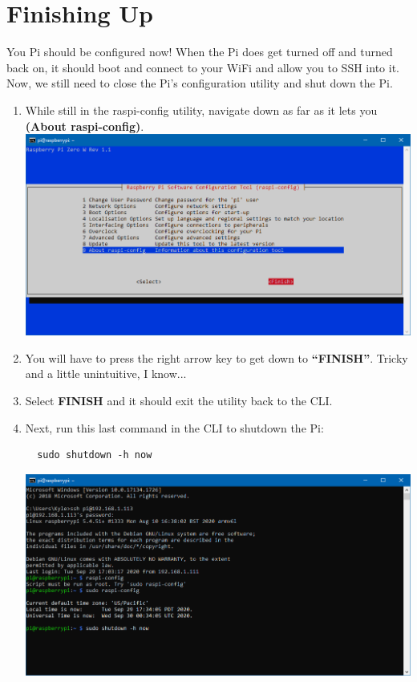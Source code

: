 \documentclass{article}
\begin{document}
\section{Finishing Up}

You Pi should be configured now! When the Pi does get turned off and turned back on, it should boot and connect to your WiFi and allow you to SSH into it. Now, we still need to close the Pi's configuration utility and shut down the Pi.

\begin{enumerate}
  \item While still in the raspi-config utility, navigate down as far as it lets you \textbf{(About raspi-config)}.
  \newline
  \newline
  \includegraphics[width=1.00\textwidth]{rcfinish}
  \item You will have to press the right arrow key to get down to \textbf{``FINISH''}. Tricky and a little unintuitive, I know...
  \item Select \textbf{FINISH} and it should exit the utility back to the CLI.
  \item Next, run this last command in the CLI to shutdown the Pi:
  \begin{lstlisting}
  sudo shutdown -h now
  \end{lstlisting}
  \includegraphics[width=1.00\textwidth]{sudoshutdown}

\end{enumerate}
\end{document}
